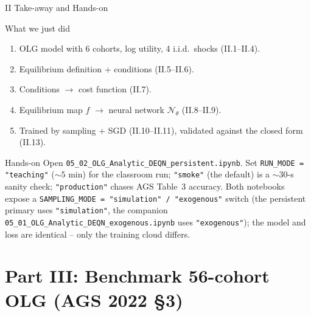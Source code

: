 \documentclass[aspectratio=169,11pt]{beamer}
\newcommand{\emphc}[1]{\textcolor{harvardcrimson}{#1}}
\newcommand{\N}{\mathcal{N}}
\begin{document}
\begin{frame}{II Take-away and Hands-on}
\footnotesize
\begin{block}{What we just did}
\begin{enumerate}\itemsep1pt
    \item OLG model with 6 cohorts, log utility, 4 i.i.d.\ shocks (II.1--II.4).
    \item Equilibrium definition + conditions (II.5--II.6).
    \item Conditions $\to$ \emphc{cost function} (II.7).
    \item Equilibrium map $f$ $\to$ neural network $\N_\theta$ (II.8--II.9).
    \item Trained by sampling + SGD (II.10--II.11), \emphc{validated} against the closed form (II.13).
\end{enumerate}
\end{block}

\begin{block}{Hands-on}
Open \texttt{05\_02\_OLG\_Analytic\_DEQN\_persistent.ipynb}.  Set \texttt{RUN\_MODE = "teaching"} ($\sim 5$ min) for the classroom run; \texttt{"smoke"} (the default) is a $\sim$30-s sanity check; \texttt{"production"} chases AGS Table~3 accuracy.  Both notebooks expose a \texttt{SAMPLING\_MODE = "simulation" / "exogenous"} switch (the persistent primary uses \texttt{"simulation"}, the companion \texttt{05\_01\_OLG\_Analytic\_DEQN\_exogenous.ipynb} uses \texttt{"exogenous"}); the model and loss are identical -- only the training cloud differs.
\end{block}
\end{frame}



\section{Part III: Benchmark 56-cohort OLG (AGS 2022 \S 3)}
\end{document}
